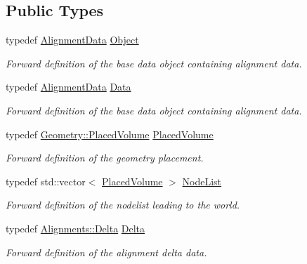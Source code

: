 \subsection*{Public Types}
\begin{DoxyCompactItemize}
\item 
typedef \hyperlink{class_d_d4hep_1_1_alignments_1_1_alignment_data}{AlignmentData} \hyperlink{class_d_d4hep_1_1_alignments_1_1_alignment_a3ed6fd0370cb7b8015d772df7ff005fc}{Object}
\begin{DoxyCompactList}\small\item\em Forward definition of the base data object containing alignment data. \item\end{DoxyCompactList}\item 
typedef \hyperlink{class_d_d4hep_1_1_alignments_1_1_alignment_data}{AlignmentData} \hyperlink{class_d_d4hep_1_1_alignments_1_1_alignment_a5ff6a2c0b838274552fbac2f52b9a652}{Data}
\begin{DoxyCompactList}\small\item\em Forward definition of the base data object containing alignment data. \item\end{DoxyCompactList}\item 
typedef \hyperlink{class_d_d4hep_1_1_geometry_1_1_placed_volume}{Geometry::PlacedVolume} \hyperlink{class_d_d4hep_1_1_alignments_1_1_alignment_a69b234d416cfa4ace8a75322f2c58b66}{PlacedVolume}
\begin{DoxyCompactList}\small\item\em Forward definition of the geometry placement. \item\end{DoxyCompactList}\item 
typedef std::vector$<$ \hyperlink{class_d_d4hep_1_1_geometry_1_1_placed_volume}{PlacedVolume} $>$ \hyperlink{class_d_d4hep_1_1_alignments_1_1_alignment_a83282984664b4e1117f46d8a8bc40cb7}{NodeList}
\begin{DoxyCompactList}\small\item\em Forward definition of the nodelist leading to the world. \item\end{DoxyCompactList}\item 
typedef \hyperlink{class_d_d4hep_1_1_alignments_1_1_delta}{Alignments::Delta} \hyperlink{class_d_d4hep_1_1_alignments_1_1_alignment_a49bf0c4249a3b792bf6a016b1d067f64}{Delta}
\begin{DoxyCompactList}\small\item\em Forward definition of the alignment delta data. \item\end{DoxyCompactList}\item 

\end{DoxyCompactItemize}
